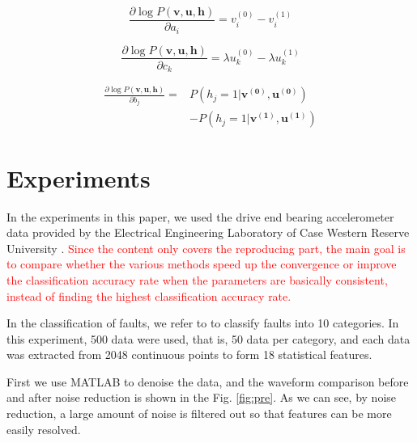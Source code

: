 \documentclass{modified}
\begin{document}
\begin{equation}
\frac{\partial \log P(\boldsymbol{v}, \boldsymbol{u}, \boldsymbol{h})}{\partial a_{i}}=v_i^{(0)}-v_i^{(1)}
\end{equation}

\begin{equation}
\frac{\partial \log P(\boldsymbol{v}, \boldsymbol{u}, \boldsymbol{h})}{\partial c_{k}}=\lambda u_k^{(0)}-\lambda u_k^{(1)}
\end{equation}

\begin{equation}
\begin{aligned} 
\frac{\partial \log P(\boldsymbol{v}, \boldsymbol{u}, \boldsymbol{h})}{\partial b_{j}}=&P(h_j=1|\boldsymbol{v^{(0)}},\boldsymbol{u^{(0)}})\\&-P(h_j=1|\boldsymbol{v^{(1)}},\boldsymbol{u^{(1)}})
\end{aligned}
\end{equation}

\section{Experiments}
In the experiments in this paper, we used the drive end bearing accelerometer data provided by the Electrical Engineering Laboratory of Case Western Reserve University \cite{data}. \textcolor{red}{Since the content only covers the reproducing part, the main goal is to compare whether the various methods speed up the convergence or improve the classification accuracy rate when the parameters are basically consistent, instead of finding the highest classification accuracy rate.}

In the classification of faults, we refer to \cite{guangquan2016fault} to classify faults into 10 categories. In this experiment, 500 data were used, that is, 50 data per category, and each data was extracted from 2048 continuous points to form 18 statistical features.

First we use MATLAB to denoise the data, and the waveform comparison before and after noise reduction is shown in the Fig. \ref{fig:pre}. As we can see, by noise reduction, a large amount of noise is filtered out so that features can be more easily resolved.
\end{document}
